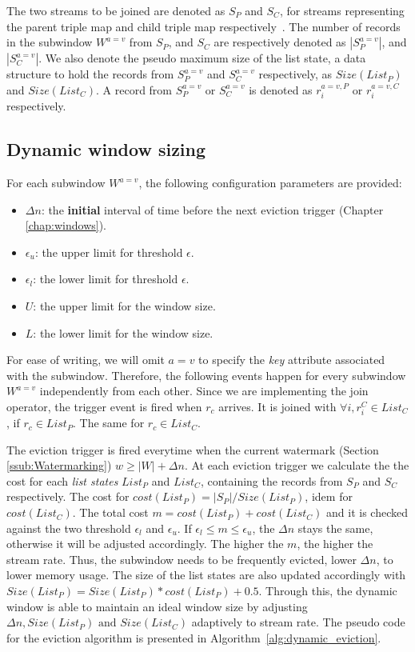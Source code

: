 The two streams to be joined are denoted as $S_P$ and $S_C$, for 
streams representing the parent triple map and child triple map respectively~\cite{rml}. 
The number of records in the subwindow $W^{a=v}$ from $S_P$, and $S_C$ are respectively 
denoted as $|S_{P}^{a=v}|$, and $|S_{C}^{a=v}|$. We also denote the 
pseudo maximum size of the list state, a data structure to hold the records 
from $S_P^{a=v}$ and $S_C^{a=v}$ respectively, as 
$Size(List_P)$ and $Size(List_C)$. A record from $S_P^{a=v}$ or $S_C^{a=v}$  
is denoted as $r_i^{a=v,P}$ or $r_i^{a=v, C}$ respectively.


\subsection{Dynamic window sizing}%
\label{sub:Dynamic window sizing}
For each subwindow $W^{a=v}$, the following configuration parameters 
are provided: 

\begin{itemize}
    \item $\Delta n$: the \textbf{initial} interval of time before the next eviction trigger (Chapter \ref{chap:windows}). 
    \item $\epsilon_u$: the upper limit for threshold $\epsilon$. 
    \item $\epsilon_l$: the lower limit for threshold $\epsilon$. 
    \item $U$: the upper limit for the window size. 
    \item $L$: the lower limit for the window size. 
\end{itemize}



For ease of writing, we will omit $a=v$ to specify the \emph{key} attribute associated 
with the subwindow. 
Therefore, the following events happen for every subwindow $W^{a=v}$ independently from 
each other. 
Since we are implementing the join operator, the trigger event is fired when  
$r_c$ arrives. It is joined with $\forall i, r_i^C \in List_C$, if $r_c \in List_P$. The same 
for $r_c \in List_C$. 

The eviction trigger is fired everytime when the current watermark (Section \ref{ssub:Watermarking}) 
$w \ge |W| + \Delta n$. At each eviction trigger we calculate the 
the cost for each \emph{list states} $List_P$ and $List_C$, containing the records from $S_P$ and $S_C$
respectively. The cost for $cost(List_P) = |S_P|/Size(List_P)$, idem for $cost(List_C)$. 
The total cost $m = cost(List_P) + cost(List_C)$ and it is checked against the 
two threshold $\epsilon_l$ and $\epsilon_u$. If  $\epsilon_l \le m \le \epsilon_u$, the 
$\Delta n$ stays the same, otherwise it will be adjusted accordingly.
The higher the $m$, the higher the stream rate. Thus, the subwindow needs to be frequently 
evicted, lower $\Delta n$, to lower memory usage. 
The size of the list states 
are also updated accordingly with $Size(List_P) = Size(List_P) * cost(List_P) + 0.5$. 
Through this, the dynamic window is able to maintain an 
ideal window size by adjusting $\Delta n, Size(List_P) \text{ and } Size(List_C)$ adaptively to 
stream rate. The pseudo code for the eviction algorithm is presented in Algorithm~\ref{alg:dynamic_eviction}. 


